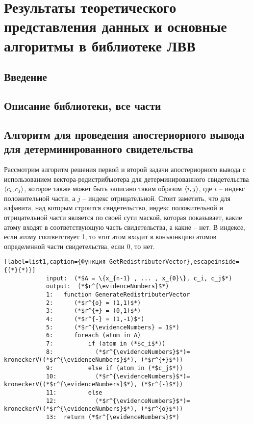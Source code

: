 \section{Результаты теоретического представления данных и основные алгоритмы в библиотеке ЛВВ}
\subsection{Введение}



\subsection{Описание библиотеки, все части}



\subsection{Алгоритм для проведения апостериорного вывода для детерминированного свидетельства}
        
        Рассмотрим алгоритм решения первой и второй задачи апостериорного вывода с использованием вектора-редистрибъютера \cite{AAZ_matr_vect} для детерминированного свидетельства $\langle c_{i}, c_{j} \rangle$, которое также может быть записано таким образом $\langle i, j \rangle$, где $i$ – индекс положительной части, а $j$ – индекс отрицательной. Стоит заметить, что для алфавита, над которым строится свидетельство, индекс положительной и отрицательной части является по своей сути маской, которая показывает, какие атому входят в соответствующую часть свидетельства, а какие – нет. В индексе, если атому соответствует 1, то этот атом входит в конъюнкцию атомов определенной части свидетельства, если 0, то нет. 
        
        \begin{lstlisting}[label=list1,caption={Функция GetRedistributerVector},escapeinside={(*}{*)}]
            input:  (*$A = \{x_{n-1} , ... , x_{0}\}, c_i, c_j$*)
            output:  (*$r^{\evidenceNumbers}$*)
            1:   function GenerateRedistributerVector
            2:   	(*$r^{o} = (1,1)$*)
            3:   	(*$r^{+} = (0,1)$*)
            4:   	(*$r^{-} = (1,-1)$*)
            5:	    (*$r^{\evidenceNumbers} = 1$*)
            6:   	foreach (atom in A)
            7:	      	if (atom in (*$c_i$*))
            8:			  (*$r^{\evidenceNumbers}$*)= kroneckerV((*$r^{\evidenceNumbers}$*), (*$r^{+}$*))
            9:	      	else if (atom in (*$c_j$*))
            10:			  (*$r^{\evidenceNumbers}$*)= kroneckerV((*$r^{\evidenceNumbers}$*), (*$r^{-}$*))
            11:	      	else
            12:			  (*$r^{\evidenceNumbers}$*)= kroneckerV((*$r^{\evidenceNumbers}$*), (*$r^{o}$*))
            13:	 return (*$r^{\evidenceNumbers}$*)
        \end{lstlisting}
        
